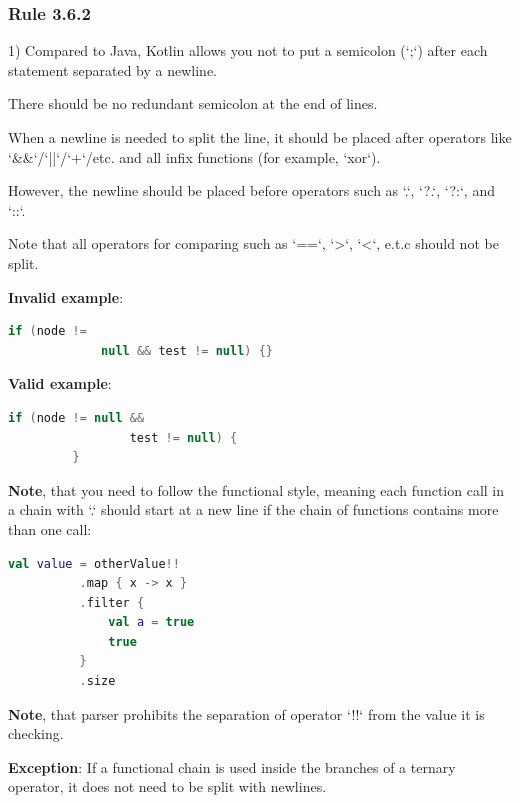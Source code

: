{\subsubsection*{\textbf{Rule 3.6.2}}
\leavevmode\newline



1) Compared to Java, Kotlin allows you not to put a semicolon (`;`) after each statement separated by a newline.

    There should be no redundant semicolon at the end of lines.



When a newline is needed to split the line, it should be placed after operators like `\&\&`/`||`/`+`/etc. and all infix functions (for example, `xor`).

However, the newline should be placed before operators such as `.`, `?.`, `?:`, and `::`.



Note that all operators for comparing such as `==`, `>`, `<`, e.t.c should not be split.



\textbf{Invalid example}:

\begin{lstlisting}[language=Kotlin]
     if (node !=
             null && test != null) {}
\end{lstlisting}


\textbf{Valid example}:

\begin{lstlisting}[language=Kotlin]
         if (node != null &&
                 test != null) {
         }
\end{lstlisting}


\textbf{Note}, that you need to follow the functional style, meaning each function call in a chain with `.` should start at a new line if the chain of functions contains more than one call:

\begin{lstlisting}[language=Kotlin]
  val value = otherValue!!
          .map { x -> x }
          .filter {
              val a = true
              true
          }
          .size
\end{lstlisting}
\textbf{Note}, that parser prohibits the separation of operator `!!` from the value it is checking.



\textbf{Exception}: If a functional chain is used inside the branches of a ternary operator, it does not need to be split with newlines.



}
